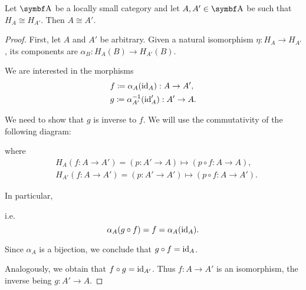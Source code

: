 \begin{proposition}\label{def:yoneda_embedding_is_injective}\cite[exercise 4.1.27]{Leinster2014}
  Let \( \Bold A \) be a locally small category and let \( A, A' \in \Bold A \) be such that \( H_A \cong H_{A'} \). Then \( A \cong A' \).
\end{proposition}
\begin{proof}
  First, let \( A \) and \( A' \) be arbitrary. Given a natural isomorphism \( \eta: H_A \to H_{A'} \), its components are \( \alpha_B: H_A(B) \to H_{A'}(B) \).

  We are interested in the morphisms
  \begin{align*}
    &f \coloneqq \alpha_A(\operatorname{id}_A): A \to A', \\
    &g \coloneqq \alpha_{A'}^{-1}(\operatorname{id}_A'): A' \to A.
  \end{align*}

  We need to show that \( g \) is inverse to \( f \). We will use the commutativity of the following diagram:
  \begin{Center}
  \end{Center}
  where
  \begin{align*}
    &H_A(f: A \to A') = (p: A' \to A) \mapsto (p \circ f: A \to A), \\
    &H_{A'}(f: A \to A') = (p: A' \to A') \mapsto (p \circ f: A \to A').
  \end{align*}

  In particular,
  \begin{Center}
  \end{Center}
  i.e.
  \begin{equation*}
    \alpha_A(g \circ f) = f = \alpha_A(\operatorname{id}_A).
  \end{equation*}

  Since \( \alpha_A \) is a bijection, we conclude that \( g \circ f = \operatorname{id}_A \).

  Analogously, we obtain that \( f \circ g = \operatorname{id}_{A'} \). Thus \( f: A \to A' \) is an isomorphism, the inverse being \( g: A' \to A \).
\end{proof}

